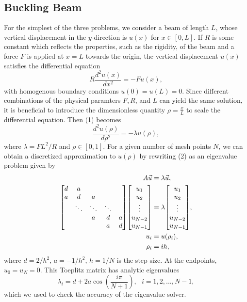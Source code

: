 \documentclass[prb,aps,twocolumn,showpacs,10pt]{revtex4-1}
\newenvironment{psmallmatrix}
  {\left[\begin{matrix}}
  {\end{matrix}\right]}
\begin{document}
\subsection{Buckling Beam}
For the simplest of the three problems, we consider a beam of length $L$, whose vertical displacement in the $y$-direction is $u(x)$ for $x \in [0,L]$. If $R$ is some constant which reflects the properties, such as the rigidity, of the beam and a force $F$ is applied at $x=L$ towards the origin, the vertical displacement $u(x)$ satisfies the differential equation
\begin{equation}
R\frac{d^2 u(x)}{dx^2} = -Fu(x),
\end{equation}
with homogenous boundary conditions $u(0)=u(L)=0$. Since different combinations of the physical paramters $F, R$, and $L$ can yield the same solution, it is beneficial to introduce the dimensionless quantity $\rho = \frac{x}{L}$ to scale the differential equation. Then (1) becomes
\begin{equation}
\frac{d^2 u(\rho)}{d\rho^2} = -\lambda u(\rho),
\end{equation}
where $\lambda = FL^2/R$ and $\rho \in [0,1]$. For a given number of mesh points $N$, we can obtain a discretized approximation to $u(\rho)$ by rewriting (2) as an eigenvalue problem given by
\begin{align}
\label{eqn:eqlabel}
\begin{split}
A\vec{u} &= \lambda \vec{u},
\\
\begin{psmallmatrix} d&a& \\
a&d&a\\
&\ddots&\ddots&\ddots\\
&&a&d&a\\
&&&a&d\\
\end{psmallmatrix}
\begin{psmallmatrix}
u_1\\u_2\\ \vdots \\ u_{N-2}\\ u_{N-1}
\end{psmallmatrix}&=
\lambda
\begin{psmallmatrix}
u_1\\u_2\\ \vdots \\ u_{N-2}\\ u_{N-1}
\end{psmallmatrix},\\
u_i &= u(\rho_i),\\
\rho_i &= ih,\\
\end{split}
\end{align}
where $d = 2/h^2$, $a = -1/h^2$, $h = 1/N$ is the step size. At the endpoints, $u_0 = u_N = 0$. This Toeplitz matrix has analytic eigenvalues
\begin{equation}
\lambda_i = d+2a\cos \left( \frac{i \pi}{N+1} \right) , \ \ \ i = 1, 2, ..., N-1,
\end{equation}
which we used to check the accuracy of the eigenvalue solver.
\end{document}
